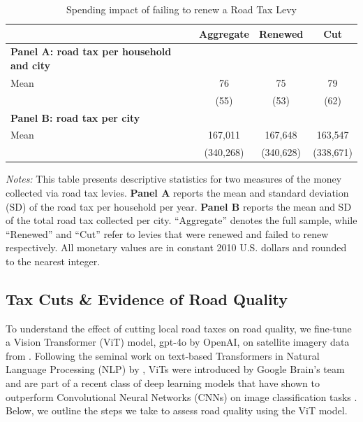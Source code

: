 \begin{table}[ht]
    \centering
    \caption{Spending impact of failing to renew a Road Tax Levy}
    \label{tab:levy_stats}
    \begin{threeparttable}
    \begin{tabular}{p{5cm}ccc}
    \hline\hline
    & \textbf{Aggregate} & \textbf{Renewed} & \textbf{Cut} \\
    \hline
    \textbf{Panel A: road tax per household and city} \\
    Mean & 76 & 75 & 79 \\
       & (55) & (53) & (62) \\
    \hline
    \textbf{Panel B: road tax per city} \\
    Mean & 167,011 & 167,648 & 163,547 \\
       & (340,268) & (340,628) & (338,671) \\
    \hline\hline
    \end{tabular}
    \begin{tablenotes}[flushleft]
      \footnotesize
      \item \textit{Notes:} 
      This table presents descriptive statistics for two measures of the money collected via road tax levies. 
      \textbf{Panel A} reports the mean and standard deviation (SD) of the road tax per household per year. 
      \textbf{Panel B} reports the mean and SD of the total road tax collected per city. 
      “Aggregate” denotes the full sample, while “Renewed” and “Cut” refer to levies that were renewed and failed to renew respectively.
      All monetary values are in constant 2010 U.S. dollars and rounded to the nearest integer.
    \end{tablenotes}
    \end{threeparttable}
\end{table}





\subsection{Tax Cuts \& Evidence of Road Quality} \label{sec:road_quality}

To understand the effect of cutting local road taxes on road quality, we fine-tune a Vision Transformer (ViT) model, gpt-4o by OpenAI, on satellite imagery data from \cite{brewer2021}. Following the seminal work on text-based Transformers in Natural Language Processing (NLP) by \cite{vaswani2017attention}, ViTs were introduced by Google Brain's team and are part of a recent class of deep learning models that have shown to outperform Convolutional Neural Networks (CNNs) on image classification tasks \citep{dosovitskiy2020image}. Below, we outline the steps we take to assess road quality using the ViT model.


